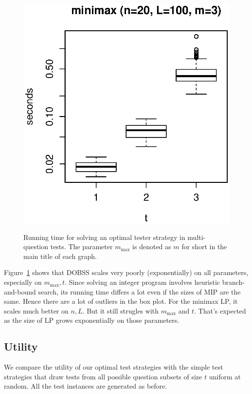 \documentclass{article}
\begin{document}
\begin{figure}
	\includegraphics[width=.23\linewidth]{multi/minimax_t}\\
	\caption{Running time for solving an optimal tester strategy in
	multi-question tests.  The parameter $m_{\text{max}}$ is denoted as $m$
	for short in the main title of each graph.}
	\label{fig:multi}
\end{figure}

Figure~\ref{fig:multi} shows that DOBSS scales very poorly (exponentially) on
all parameters, especially on $m_{\text{max}}, t$. Since solving an integer
program involves heuristic branch-and-bound search, its running time differs a
lot even if the sizes of MIP are the same.  Hence there are a lot of outliers
in the box plot. For the minimax LP, it scales much better on $n, L$. But it
still strugles with $m_{\text{max}}$ and $t$. That's expected as the size of
LP grows exponentially on those parameters.

\subsection{Utility}

We compare the utility of our optimal test strategies with the simple test
strategies that draw tests from all possible question subsets of size $t$
uniform at random. All the test instances are generated as before.
\end{document}
